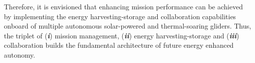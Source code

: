 \documentclass{ifacconf}
\begin{document}
Therefore, it is envisioned that enhancing mission performance can be
achieved by implementing the energy harvesting-storage and collaboration
capabilities onboard of multiple autonomous solar-powered and thermal-soaring
gliders. Thus, the triplet of (\emph{\textbf{i}}) mission management,
(\emph{\textbf{ii}}) energy harvesting-storage and (\emph{\textbf{iii}})
collaboration builds the fundamental architecture of future energy enhanced
autonomy.
%
\end{document}
